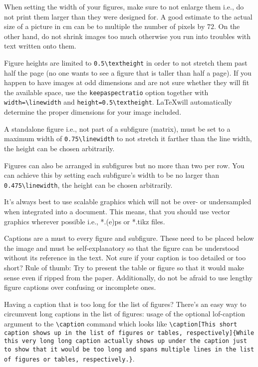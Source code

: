 When setting the width of your figures, make sure to not enlarge them i.e., do not print them larger than they were designed for.
A good estimate to the actual size of a picture in $\si{\cm}$ can be to multiple the number of pixels by $72$.
On the other hand, do not shrink images too much otherwise you run into troubles with text written onto them.

Figure heights are limited to \lstinline!0.5\textheight! in order to not stretch them past half the page (no one wants to see a figure that is taller than half a page).
If you happen to have images at odd dimensions and are not sure whether they will fit the available space, use the \lstinline!keepaspectratio! option together with \lstinline!width=\linewidth! and \lstinline!height=0.5\textheight!.
\LaTeX will automatically determine the proper dimensions for your image included.

A standalone figure i.e., not part of a subfigure (matrix), must be set to a maximum width of \lstinline!0.75\linewidth! to not stretch it farther than the line width, the height can be chosen arbitrarily.

Figures can also be arranged in subfigures but no more than two per row.
You can achieve this by setting each subfigure's width to be no larger than \lstinline!0.475\linewidth!, the height can be chosen arbitrarily.

It's always best to use scalable graphics which will not be over- or undersampled when integrated into a document.
This means, that you should use vector graphics wherever possible i.e., *.(e)ps or *.tikz files.

Captions are a must to every figure and subfigure.
These need to be placed below the image and must be self-explanatory so that the figure can be understood without its reference in the text.
Not sure if your caption is too detailed or too short?
Rule of thumb: Try to present the table or figure so that it would make sense even if ripped from the paper.
Additionally, do not be afraid to use lengthy figure captions over confusing or incomplete ones.

Having a caption that is too long for the list of figures? There's an easy way to circumvent long captions in the list of figures: usage of the optional lof-caption argument to the \lstinline!\caption! command which looks like \lstinline[language={[LaTeX]TeX}]!\caption[This short caption shows up in the list of figures or tables, respectively]{While this very long long caption actually shows up under the caption just to show that it would be too long and spans multiple lines in the list of figures or tables, respectively.}!.

